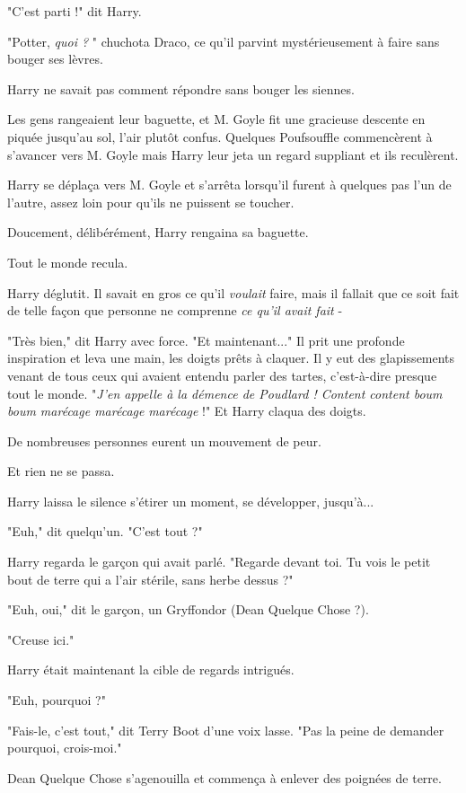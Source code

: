"C'est parti !" dit Harry.

"Potter, \emph{quoi ?} " chuchota Draco, ce qu'il parvint mystérieusement à faire sans bouger ses lèvres.

Harry ne savait pas comment répondre sans bouger les siennes.

Les gens rangeaient leur baguette, et M. Goyle fit une gracieuse descente en piquée jusqu'au sol, l'air plutôt confus. Quelques Poufsouffle commencèrent à s'avancer vers M. Goyle mais Harry leur jeta un regard suppliant et ils reculèrent.

Harry se déplaça vers M. Goyle et s'arrêta lorsqu'il furent à quelques pas l'un de l'autre, assez loin pour qu'ils ne puissent se toucher.

Doucement, délibérément, Harry rengaina sa baguette.

Tout le monde recula.

Harry déglutit. Il savait en gros ce qu'il \emph{voulait}  faire, mais il fallait que ce soit fait de telle façon que personne ne comprenne \emph{ce qu'il avait fait}  -

"Très bien," dit Harry avec force. "Et maintenant..." Il prit une profonde inspiration et leva une main, les doigts prêts à claquer. Il y eut des glapissements venant de tous ceux qui avaient entendu parler des tartes, c'est-à-dire presque tout le monde. "\emph{J'en appelle à la démence de Poudlard ! Content content boum boum marécage marécage}  \emph{marécage } !" Et Harry claqua des doigts.

De nombreuses personnes eurent un mouvement de peur.

Et rien ne se passa.

Harry laissa le silence s'étirer un moment, se développer, jusqu'à...

"Euh," dit quelqu'un. "C'est tout ?"

Harry regarda le garçon qui avait parlé. "Regarde devant toi. Tu vois le petit bout de terre qui a l'air stérile, sans herbe dessus ?"

"Euh, oui," dit le garçon, un Gryffondor (Dean Quelque Chose ?).

"Creuse ici."

Harry était maintenant la cible de regards intrigués.

"Euh, pourquoi ?"

"Fais-le, c'est tout," dit Terry Boot d'une voix lasse. "Pas la peine de demander pourquoi, crois-moi."

Dean Quelque Chose s'agenouilla et commença à enlever des poignées de terre.

